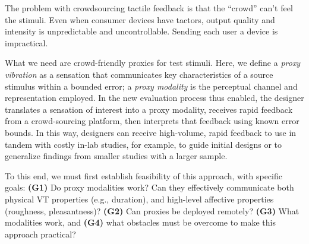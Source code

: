     
    The  problem with crowdsourcing tactile feedback is that the ``crowd''  can't feel the stimuli. Even when consumer devices have tactors,  output quality and intensity is unpredictable and uncontrollable.
    Sending each user a device is impractical.
    
    

    
   What we need are crowd-friendly proxies for test stimuli.
    Here, we define a \emph{proxy vibration} as a sensation that communicates key characteristics of a source stimulus within a bounded error; a \emph{proxy modality} is the perceptual channel and representation employed.
    In the new evaluation process thus enabled, the designer translates a sensation of interest into a proxy modality, receives rapid feedback from a crowd-sourcing platform, then interprets that feedback using known error bounds.
    In this way, designers can receive high-volume, rapid feedback to use in tandem with costly in-lab studies, for example, to guide initial designs or to generalize findings from smaller studies with a larger sample.
    
    
    To this end, we must first establish  feasibility of this approach, with specific goals: 
    \textbf{(G1)} {Do proxy modalities work?} Can they effectively communicate both physical VT properties (e.g., duration), and high-level affective properties (roughness, pleasantness)? 
      \textbf{(G2)} {Can proxies be deployed remotely?}
      \textbf{(G3)} {What modalities work}, and 
      \textbf{(G4)} {what obstacles must be overcome to make this approach practical?}
    
